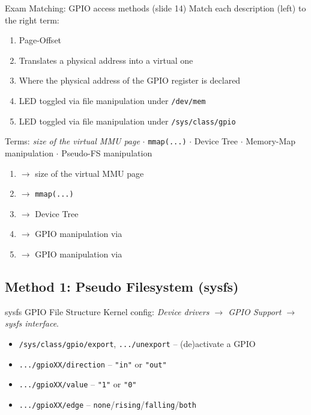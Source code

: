\begin{example2}{Exam Matching: GPIO access methods (slide 14)}
    Match each description (left) to the right term:
    \begin{enumerate}
        \item Page-Offset
        \item Translates a physical address into a virtual one
        \item Where the physical address of the GPIO register is declared
        \item LED toggled via file manipulation under \texttt{/dev/mem}
        \item LED toggled via file manipulation under \texttt{/sys/class/gpio}
    \end{enumerate}
    Terms: \emph{size of the virtual MMU page} $\cdot$ \texttt{mmap(...)} $\cdot$
    Device Tree $\cdot$ Memory-Map manipulation $\cdot$ Pseudo-FS manipulation
    \tcblower
    \begin{enumerate}
        \item $\to$ size of the virtual MMU page
        \item $\to$ \texttt{mmap(...)}
        \item $\to$ Device Tree
        \item $\to$ GPIO manipulation via 
        \item $\to$ GPIO manipulation via 
    \end{enumerate}
\end{example2}

\subsection{Method 1: Pseudo Filesystem (sysfs)}

\begin{definition}{sysfs GPIO File Structure}
    Kernel config: \emph{Device drivers $\to$ GPIO Support $\to$ sysfs interface}.
    \begin{itemize}
        \item \texttt{/sys/class/gpio/export}, \texttt{.../unexport} -- (de)activate a GPIO
        \item \texttt{.../gpioXX/direction} -- \texttt{"in"} or \texttt{"out"}
        \item \texttt{.../gpioXX/value} -- \texttt{"1"} or \texttt{"0"}
        \item \texttt{.../gpioXX/edge} -- \texttt{none}/\texttt{rising}/\texttt{falling}/\texttt{both}
    \end{itemize}
\end{definition}

